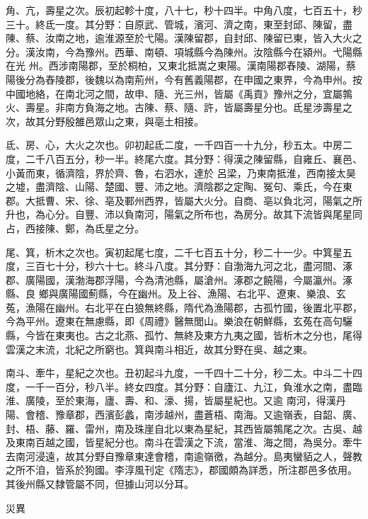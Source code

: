 \begin{pinyinscope}
 角、亢，壽星之次。辰初起軫十度，八十七，秒十四半。中角八度，七百五十，秒三十。終氐一度。其分野：自原武、管城，濱河、濟之南，東至封邱、陳留，盡陳、蔡、汝南之地，逾淮源至於弋陽。漢陳留郡，自封邱、陳留已東，皆入大火之分。漢汝南，今為豫州。西華、南頓、項城縣今為陳州。汝陰縣今在潁州。弋陽縣在光
 州。西涉南陽郡，至於桐柏，又東北抵嵩之東陽。漢南陽郡舂陵、湖陽，蔡陽後分為舂陵郡，後魏以為南荊州，今有舊義陽郡，在申國之東界，今為申州。按中國地絡，在南北河之間，故申、隨、光三州，皆屬《禹貢》豫州之分，宜屬鶉火、壽星。非南方負海之地。古陳、蔡、隨、許，皆屬壽星分也。氐星涉壽星之次，故其分野殷雒邑眾山之東，與亳土相接。



 氐、房、心，大火之次也。卯初起氐二度，一千四百一十九分，秒五太。中房二度，二千八百五分，秒一半。終尾六度。其分野：得漢之陳留縣，自雍丘、襄邑、小黃而東，循濟陰，界於齊、魯，右泗水，達於
 呂梁，乃東南抵淮，西南接太昊之墟，盡濟陰、山陽、楚國、豐、沛之地。濟陰郡之定陶、冤句、乘氏，今在東郡。大抵曹、宋、徐、亳及鄆州西界，皆屬大火分。自商、亳以負北河，陽氣之所升也，為心分。自豐、沛以負南河，陽氣之所布也，為房分。故其下流皆與尾星同占，西接陳、鄭，為氐星之分。



 尾、箕，析木之次也。寅初起尾七度，二千七百五十分，秒二十一少。中箕星五度，三百七十分，秒六十七。終斗八度。其分野：自渤海九河之北，盡河間、涿郡、廣陽國，漢渤海郡浮陽，今為清池縣，屬滄州。涿郡之饒陽，今屬瀛州。涿縣、良
 鄉與廣陽國薊縣，今在幽州。及上谷、漁陽、右北平、遼東、樂浪、玄菟，漁陽在幽州。右北平在白狼無終縣，隋代為漁陽郡，古孤竹國，後置北平郡，今為平州。遼東在無慮縣，即《周禮》醫無閭山。樂浪在朝鮮縣，玄菟在高句驪縣，今皆在東夷也。古之北燕、孤竹、無終及東方九夷之國，皆析木之分也，尾得雲漢之末流，北紀之所窮也。箕與南斗相近，故其分野在吳、越之東。



 南斗、牽牛，星紀之次也。丑初起斗九度，一千四十二十分，秒二太。中斗二十四度，一千一百分，秒八半。終女四度。其分野：自廬江、九江，負淮水之南，盡臨淮、廣陵，至於東海，廬、壽、和、濠、揚，皆屬星紀也。又逾
 南河，得漢丹陽、會稽、豫章郡，西濱彭蠡，南涉越州，盡蒼梧、南海。又逾嶺表，自韶、廣、封、梧、藤、羅、雷州，南及珠崖自北以東為星紀，其西皆屬鶉尾之次。古吳、越及東南百越之國，皆星紀分也。南斗在雲漢之下流，當淮、海之間，為吳分。牽牛去南河浸遠，故其分野自豫章東達會稽，南逾嶺徼，為越分。島夷蠻貊之人，聲教之所不洎，皆系於狗國。李淳風刊定《隋志》，郡國頗為詳悉，所注郡邑多依用。其後州縣又隸管屬不同，但據山河以分耳。



 災異




\end{pinyinscope}
